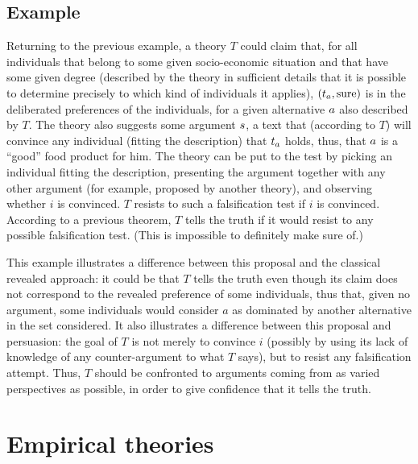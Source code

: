 \documentclass[version=last, pagesize, twoside=off, bibliography=totoc, DIV=calc, fontsize=12pt, a4paper, french, english]{scrartcl}
\begin{document}
\subsection{Example}
\begin{example}[(cont.)]
	Returning to the previous example, a theory $T$ could claim that, for all individuals that belong to some given socio-economic situation and that have some given degree (described by the theory in sufficient details that it is possible to determine precisely to which kind of individuals it applies), $(t_a, \text{sure})$ is in the deliberated preferences of the individuals, for a given alternative $a$ also described by $T$. 
The theory also suggests some argument $\ar$, a text that (according to $T$) will convince any individual (fitting the description) that $t_a$ holds, thus, that $a$ is a “good” food product for him. 
The theory can be put to the test by picking an individual fitting the description, presenting the argument together with any other argument (for example, proposed by another theory), and observing whether $i$ is convinced.
$T$ resists to such a falsification test if $i$ is convinced. According to a previous theorem, $T$ tells the truth if it would resist to any possible falsification test. (This is impossible to definitely make sure of.)
\end{example}
This example illustrates a difference between this proposal and the classical revealed approach: it could be that $T$ tells the truth even though its claim does not correspond to the revealed preference of some individuals, thus that, given no argument, some individuals would consider $a$ as dominated by another alternative in the set considered. It also illustrates a difference between this proposal and persuasion: the goal of $T$ is not merely to convince $i$ (possibly by using its lack of knowledge of any counter-argument to what $T$ says), but to resist any falsification attempt. Thus, $T$ should be confronted to arguments coming from as varied perspectives as possible, in order to give confidence that it tells the truth.

\section{Empirical theories}
\end{document}
